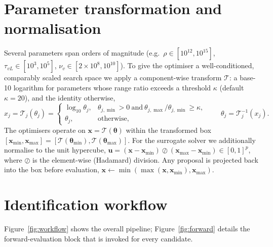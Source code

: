 \documentclass[11pt]{article}
\newcommand{\param}{\bm{\theta}}
\newcommand{\xv}{\bm{x}}
\begin{document}
\section{Parameter transformation and normalisation}
Several parameters span orders of magnitude (e.g.\ $\rho\in[10^{12},10^{15}]$,
$\tau_{vL}\in[10^{3},10^{5}]$, $\nu_v\in[2\times10^{8},10^{10}]$). To give the
optimiser a well-conditioned, comparably scaled search space we apply a
component-wise transform $\mathcal{T}$: a base-10 logarithm for parameters whose
range ratio exceeds a threshold $\kappa$ (default $\kappa=20$), and the identity
otherwise,
\begin{equation}
  x_j=\mathcal{T}_j(\theta_j)=
  \begin{cases}
    \log_{10}\theta_j, & \theta_{j,\min}>0 \ \text{and}\ \theta_{j,\max}/\theta_{j,\min}\ge \kappa,\\[2pt]
    \theta_j, & \text{otherwise,}
  \end{cases}
  \qquad
  \theta_j=\mathcal{T}_j^{-1}(x_j).
  \label{eq:transform}
\end{equation}
The optimisers operate on $\xv=\mathcal{T}(\param)$ within the transformed box
$[\xv_{\min},\xv_{\max}]=[\mathcal{T}(\param_{\min}),\mathcal{T}(\param_{\max})]$.
For the surrogate solver we additionally normalise to the unit hypercube,
$\bm{u}=(\xv-\xv_{\min})\oslash(\xv_{\max}-\xv_{\min})\in[0,1]^{p}$, where $\oslash$
is the element-wise (Hadamard) division. Any proposal is projected back into the
box before evaluation, $\xv\leftarrow\min(\max(\xv,\xv_{\min}),\xv_{\max})$.

\section{Identification workflow}
Figure~\ref{fig:workflow} shows the overall pipeline; Figure~\ref{fig:forward}
details the forward-evaluation block that is invoked for every candidate.
\end{document}
